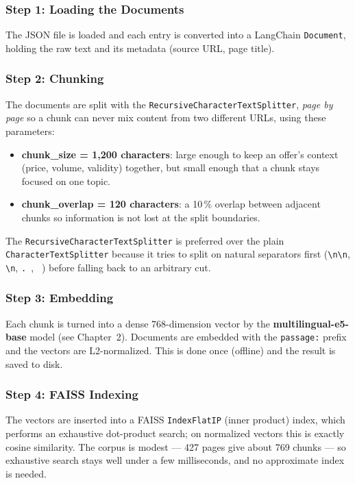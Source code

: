 \documentclass[12pt, a4paper]{report}
\newcommand{\humantext}[1]{#1}      %
\newcommand{\numPages}{427}\newcommand{\numArPages}{190}\newcommand{\numPricedPages}{117}
\newcommand{\numChunks}{769}\newcommand{\numRoutes}{7}\newcommand{\numRules}{11}
\begin{document}
\subsubsection{Step 1: Loading the Documents}
\humantext{The JSON file is loaded and each entry is converted into a LangChain \texttt{Document}, holding the raw text and its metadata (source URL, page title).}

\subsubsection{Step 2: Chunking}
\humantext{The documents are split with the \texttt{RecursiveCharacterTextSplitter}, \emph{page by page} so a chunk can never mix content from two different URLs, using these parameters:}
\begin{itemize}[noitemsep]
    \item \humantext{\textbf{chunk\_size = 1{,}200 characters}: large enough to keep an offer's context (price, volume, validity) together, but small enough that a chunk stays focused on one topic.}
    \item \humantext{\textbf{chunk\_overlap = 120 characters}: a 10\,\% overlap between adjacent chunks so information is not lost at the split boundaries.}
\end{itemize}

\humantext{The \texttt{RecursiveCharacterTextSplitter} is preferred over the plain \texttt{CharacterTextSplitter} because it tries to split on natural separators first (\texttt{\textbackslash n\textbackslash n}, \texttt{\textbackslash n}, \texttt{. }, \texttt{ }) before falling back to an arbitrary cut.}

\subsubsection{Step 3: Embedding}
\humantext{Each chunk is turned into a dense 768-dimension vector by the \textbf{multilingual-e5-base} model (see Chapter~2). Documents are embedded with the \texttt{passage:} prefix and the vectors are L2-normalized. This is done once (offline) and the result is saved to disk.}

\subsubsection{Step 4: FAISS Indexing}
\humantext{The vectors are inserted into a FAISS \texttt{IndexFlatIP} (inner product) index, which performs an exhaustive dot-product search; on normalized vectors this is exactly cosine similarity. The corpus is modest --- \numPages{} pages give about \numChunks{} chunks --- so exhaustive search stays well under a few milliseconds, and no approximate index is needed.}
\end{document}
